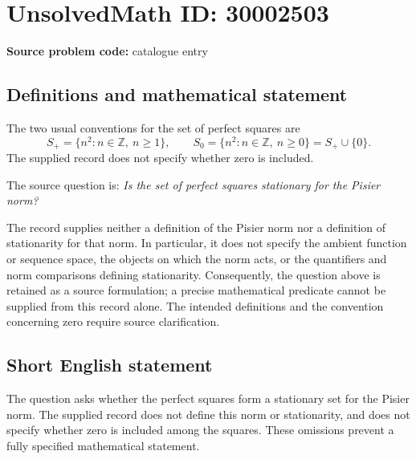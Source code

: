 \documentclass[11pt]{article}
\newcommand{\Z}{\mathbb{Z}}
\begin{document}
\section*{UnsolvedMath ID: 30002503}
\textbf{Source problem code:} catalogue entry
\subsection{Definitions and mathematical statement}
The two usual conventions for the set of perfect squares are
\[
S_{+}=\{n^{2}:n\in\Z,\ n\geq 1\},\qquad
S_{0}=\{n^{2}:n\in\Z,\ n\geq 0\}=S_{+}\cup\{0\}.
\]
The supplied record does not specify whether zero is included.

The source question is: \emph{Is the set of perfect squares stationary for the Pisier norm?}

The record supplies neither a definition of the Pisier norm nor a definition of stationarity for that norm. In particular, it does not specify the ambient function or sequence space, the objects on which the norm acts, or the quantifiers and norm comparisons defining stationarity. Consequently, the question above is retained as a source formulation; a precise mathematical predicate cannot be supplied from this record alone. The intended definitions and the convention concerning zero require source clarification.
\subsection{Short English statement}
The question asks whether the perfect squares form a stationary set for the Pisier norm. The supplied record does not define this norm or stationarity, and does not specify whether zero is included among the squares. These omissions prevent a fully specified mathematical statement.
\end{document}
